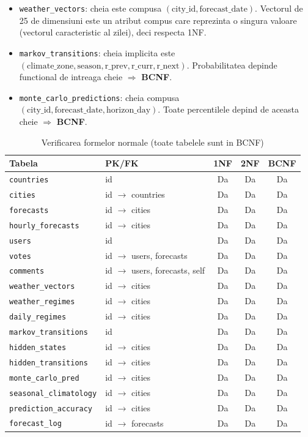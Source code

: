 \documentclass[12pt,a4paper]{article}
\begin{document}
\begin{itemize}
    \item \texttt{weather\_vectors}: cheia este compusa $(\text{city\_id}, \text{forecast\_date})$. Vectorul de 25 de dimensiuni este un atribut compus care reprezinta o singura valoare (vectorul caracteristic al zilei), deci respecta 1NF.
    \item \texttt{markov\_transitions}: cheia implicita este $(\text{climate\_zone}, \text{season}, \text{r\_prev}, \text{r\_curr}, \text{r\_next})$. Probabilitatea depinde functional de intreaga cheie $\Rightarrow$ \textbf{BCNF}.
    \item \texttt{monte\_carlo\_predictions}: cheia compusa $(\text{city\_id}, \text{forecast\_date}, \text{horizon\_day})$. Toate percentilele depind de aceasta cheie $\Rightarrow$ \textbf{BCNF}.
\end{itemize}

\begin{table}[H]
\centering\small\setlength{\tabcolsep}{4pt}
\begin{tabular}{@{}llccc@{}}
\toprule
\textbf{Tabela} & \textbf{PK/FK} & \textbf{1NF} & \textbf{2NF} & \textbf{BCNF} \\
\midrule
\texttt{countries} & id & Da & Da & Da \\
\texttt{cities} & id $\rightarrow$ countries & Da & Da & Da \\
\texttt{forecasts} & id $\rightarrow$ cities & Da & Da & Da \\
\texttt{hourly\_forecasts} & id $\rightarrow$ cities & Da & Da & Da \\
\texttt{users} & id & Da & Da & Da \\
\texttt{votes} & id $\rightarrow$ users, forecasts & Da & Da & Da \\
\texttt{comments} & id $\rightarrow$ users, forecasts, self & Da & Da & Da \\
\texttt{weather\_vectors} & id $\rightarrow$ cities & Da & Da & Da \\
\texttt{weather\_regimes} & id $\rightarrow$ cities & Da & Da & Da \\
\texttt{daily\_regimes} & id $\rightarrow$ cities & Da & Da & Da \\
\texttt{markov\_transitions} & id & Da & Da & Da \\
\texttt{hidden\_states} & id $\rightarrow$ cities & Da & Da & Da \\
\texttt{hidden\_transitions} & id $\rightarrow$ cities & Da & Da & Da \\
\texttt{monte\_carlo\_pred} & id $\rightarrow$ cities & Da & Da & Da \\
\texttt{seasonal\_climatology} & id $\rightarrow$ cities & Da & Da & Da \\
\texttt{prediction\_accuracy} & id $\rightarrow$ cities & Da & Da & Da \\
\texttt{forecast\_log} & id $\rightarrow$ forecasts & Da & Da & Da \\
\bottomrule
\end{tabular}
\caption{Verificarea formelor normale (toate tabelele sunt in BCNF)}
\end{table}
\end{document}
